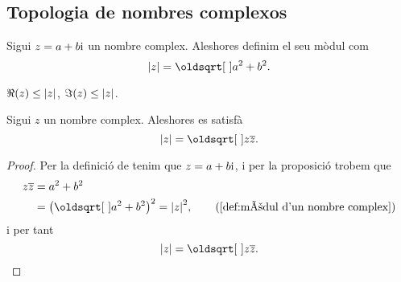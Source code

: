 \documentclass[../../Main.tex]{subfiles}
\begin{document}
	\subsection{Topologia de nombres complexos}
	\begin{definition}
		\label{def:mòdul d'un nombre complex}
		Sigui \(z = a+b\mathrm{i}\) un nombre complex.
        Aleshores definim el seu mòdul com
		\[
            \modul{z} = \sqrt{a^{2}+b^{2}}.
        \]
	\end{definition}
	\begin{observation}
		\label{obs:les parts real i imaginàries d'un complex són menors que el seu mòdul}
		\label{obs:la part real d'un complex és menor que el seu mòdul}
		\label{obs:la part imaginària d'un complex és menor que el seu mòdul}
		\(\Re(z)\leq\modul{z}\), \(\Im(z)\leq\modul{z}\).
	\end{observation}
	\begin{proposition}
		\label{prop:el mòdul d'un nombre complex és l'arrel del nombre pel seu conjugat}
		Sigui \(z\) un nombre complex.
        Aleshores es satisfà
		\[
            \modul{z} = \sqrt{z\conjugat{z}}.
        \]
		\begin{proof}
			Per la definició de  tenim que \(z = a+b\mathrm{i}\), i per la proposició  trobem que
			\begin{align*}
				z\conjugat{z} &= a^{2}+b^{2} \\
				 &= \big(\sqrt{a^{2}+b^{2}}\big)^{2} = \modul{z}^{2}, \tag{\ref{def:mòdul d'un nombre complex}}
			\end{align*}
			i per tant 
			\[
                \modul{z} = \sqrt{z\conjugat{z}}.\qedhere
            \]
		\end{proof}
	\end{proposition}
\end{document}
